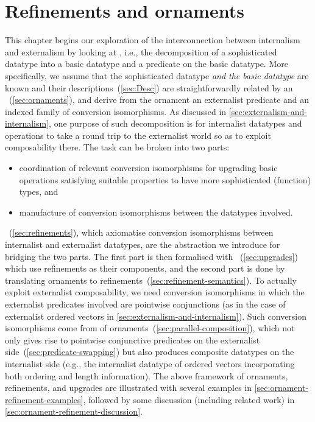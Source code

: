 \chapter{Refinements and ornaments}
\label{chap:refinements-and-ornaments}

This chapter begins our exploration of the interconnection between internalism and externalism by looking at , i.e., the decomposition of a sophisticated datatype into a basic datatype and a predicate on the basic datatype.
More specifically, we assume that the sophisticated datatype \emph{and the basic datatype} are known and their descriptions~(\autoref{sec:Desc}) are straightforwardly related by an ~(\autoref{sec:ornaments}), and derive from the ornament an externalist predicate and an indexed family of conversion isomorphisms.
As discussed in \autoref{sec:externalism-and-internalism}, one purpose of such decomposition is for internalist datatypes and operations to take a round trip to the externalist world so as to exploit composability there.
The task can be broken into two parts:
\begin{itemize}
\item coordination of relevant conversion isomorphisms for upgrading basic operations satisfying suitable properties to have more sophisticated (function) types, and
\item manufacture of conversion isomorphisms between the datatypes involved.
\end{itemize}
~(\autoref{sec:refinements}), which axiomatise conversion isomorphisms between internalist and externalist datatypes, are the abstraction we introduce for bridging the two parts.
The first part is then formalised with ~(\autoref{sec:upgrades}) which use refinements as their components, and the second part is done by translating ornaments to refinements~(\autoref{sec:refinement-semantics}).
To actually exploit externalist composability, we need conversion isomorphisms in which the externalist predicates involved are pointwise conjunctions (as in the case of externalist ordered vectors in \autoref{sec:externalism-and-internalism}).
Such conversion isomorphisms come from  of ornaments~(\autoref{sec:parallel-composition}), which not only gives rise to pointwise conjunctive predicates on the externalist side~(\autoref{sec:predicate-swapping}) but also produces composite datatypes on the internalist side (e.g., the internalist datatype of ordered vectors incorporating both ordering and length information).
The above framework of ornaments, refinements, and upgrades are illustrated with several examples in \autoref{sec:ornament-refinement-examples}, followed by some discussion (including related work) in \autoref{sec:ornament-refinement-discussion}.


